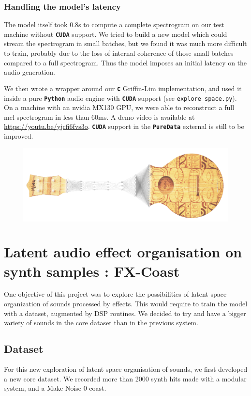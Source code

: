 \documentclass[11pt, english]{article}
\begin{document}
\subsubsection{Handling the model's latency}

The model itself took 0.8s to compute a complete spectrogram on our test machine without \textbf{\texttt{CUDA}} support. We tried to build a new model which could stream the spectrogram in small batches, but we found it was much more difficult to train, probably due to the loss of internal coherence of those small batches compared to a full spectrogram. Thus the model imposes an initial latency on the audio generation.  \newline

We then wrote a wrapper around our \textbf{\texttt{C}} Griffin-Lim implementation, and used it inside a pure \textbf{\texttt{Python}} audio engine with \textbf{\texttt{CUDA}} support (see \texttt{explore\_space.py}). On a machine with an nvidia MX130 GPU, we were able to reconstruct a full mel-spectrogram in less than 60ms. A demo video is available at \href{https://youtu.be/yjcfi6fvs3o}{https://youtu.be/yjcfi6fvs3o}. \textbf{\texttt{CUDA}} support in the \textbf{\texttt{PureData}} external is still to be improved. \vspace{1cm}

\begin{figure}[!h]
    \centering
    \includegraphics[width=.8\linewidth]{img/ukulelatent_petit.jpg}
\end{figure}


\section{Latent audio effect organisation on synth samples : FX-Coast}
One objective of this project was to explore the possibilities of latent space organization of sounds processed by effects. This would require to train the model with a dataset, augmented by DSP routines.
We decided to try and have a bigger variety of sounds in the core dataset than in the previous system.

\subsection{Dataset}
For this new exploration of latent space organisation of sounds, we first developed a new core dataset. We recorded more than 2000 synth hits made with a modular system, and a Make Noise 0-coast.
\end{document}
